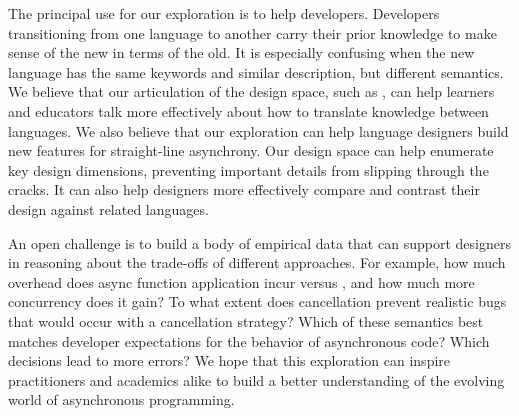 The principal use for our exploration is to help developers. Developers transitioning from one language to another carry their prior knowledge to make sense of the new in terms of the old. It is especially confusing when the new language has the same keywords and similar description, but different semantics. We believe that our articulation of the design space, such as , can help learners and educators talk more effectively about how to translate knowledge between languages.
%
We also believe that our exploration can help language designers build new features for straight-line asynchrony. Our design space can help enumerate key design dimensions, preventing important details from slipping through the cracks. It can also help designers more effectively compare and contrast their design against related languages.

An open challenge is to build a body of empirical data that can support designers in reasoning about the trade-offs of different approaches. For example, how much overhead does \seager async function application incur versus \eager, and how much more concurrency does it gain? To what extent does \simultaneous cancellation prevent realistic bugs that would occur with a \bup cancellation strategy? Which of these semantics best matches developer expectations for the behavior of asynchronous code? Which decisions lead to more errors? We hope that this exploration can inspire practitioners and academics alike to build a better understanding of the evolving world of asynchronous programming.
